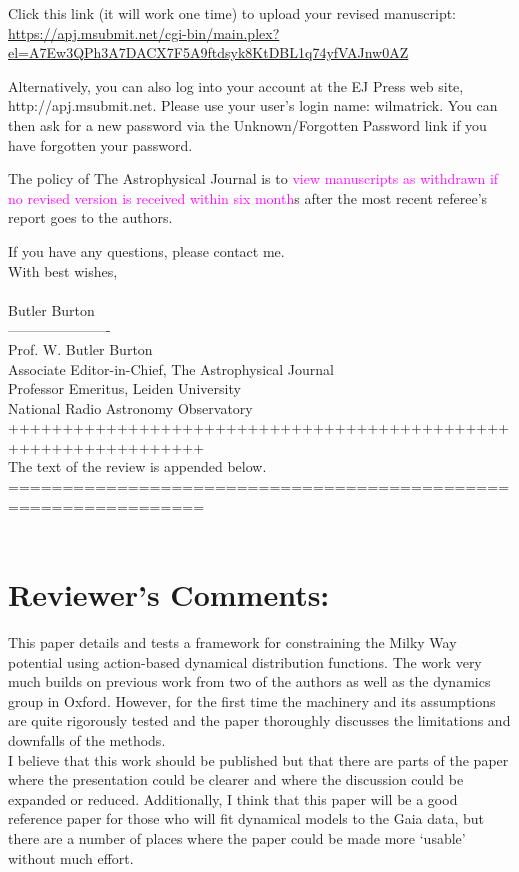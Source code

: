 \documentclass[10pt,a4paper]{article}
\newcommand{\Wilma}[1]{\textcolor{Magenta}{#1}}
\begin{document}
Click this link (it will work one time) to upload your revised manuscript:
\url{https://apj.msubmit.net/cgi-bin/main.plex?el=A7Ew3QPh3A7DACX7F5A9ftdsyk8KtDBL1q74yfVAJnw0AZ}

Alternatively, you can also log into your account at the EJ Press web site,
http://apj.msubmit.net.  Please use your user's login name: wilmatrick.  You can
then ask for a new password via the Unknown/Forgotten Password link if you have
forgotten your password. 

The policy of The Astrophysical Journal is to \Wilma{view manuscripts as withdrawn if no
revised version is received within six month}s after the most recent referee's report
goes to the authors.

If you have any questions, please contact me.\\


With best wishes,\\\\
Butler Burton\\
----------------------\\
Prof. W. Butler Burton\\
Associate Editor-in-Chief, The Astrophysical Journal\\
Professor Emeritus, Leiden University\\
National Radio Astronomy Observatory\\

++++++++++++++++++++++++++++++++++++++++++++++++++++++++++++++++\\
The text of the review is appended below.\\
================================================================\\\\ 
  
\section{Reviewer's Comments:}

This paper details and tests a framework for constraining the Milky Way potential
using action-based dynamical distribution functions. The work very much builds on
previous work from two of the authors as well as the dynamics group in Oxford.
However, for the first time the machinery and its assumptions are quite rigorously
tested and the paper thoroughly discusses the limitations and downfalls of the
methods.\\

I believe that this work should be published but that there are parts of the paper
where the presentation could be clearer and where the discussion could be expanded
or reduced. Additionally, I think that this paper will be a good reference paper for
those who will fit dynamical models to the Gaia data, but there are a number of
places where the paper could be made more `usable' without much effort.\\
\end{document}
